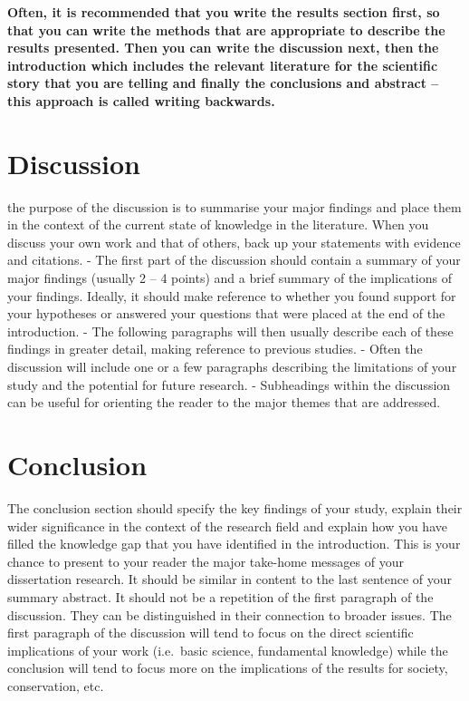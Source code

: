 \documentclass[
  12pt,
]{article}
\begin{document}
\textbf{Often, it is recommended that you write the results section
first, so that you can write the methods that are appropriate to
describe the results presented. Then you can write the discussion next,
then the introduction which includes the relevant literature for the
scientific story that you are telling and finally the conclusions and
abstract -- this approach is called writing backwards.} \newpage

\hypertarget{discussion}{%
\section{Discussion}\label{discussion}}

the purpose of the discussion is to summarise your major findings and
place them in the context of the current state of knowledge in the
literature. When you discuss your own work and that of others, back up
your statements with evidence and citations. - The first part of the
discussion should contain a summary of your major findings (usually 2 --
4 points) and a brief summary of the implications of your findings.
Ideally, it should make reference to whether you found support for your
hypotheses or answered your questions that were placed at the end of the
introduction. - The following paragraphs will then usually describe each
of these findings in greater detail, making reference to previous
studies. - Often the discussion will include one or a few paragraphs
describing the limitations of your study and the potential for future
research. - Subheadings within the discussion can be useful for
orienting the reader to the major themes that are addressed. \newpage

\hypertarget{conclusion}{%
\section{Conclusion}\label{conclusion}}

The conclusion section should specify the key findings of your study,
explain their wider significance in the context of the research field
and explain how you have filled the knowledge gap that you have
identified in the introduction. This is your chance to present to your
reader the major take-home messages of your dissertation research. It
should be similar in content to the last sentence of your summary
abstract. It should not be a repetition of the first paragraph of the
discussion. They can be distinguished in their connection to broader
issues. The first paragraph of the discussion will tend to focus on the
direct scientific implications of your work (i.e.~basic science,
fundamental knowledge) while the conclusion will tend to focus more on
the implications of the results for society, conservation, etc. \newpage
\end{document}
